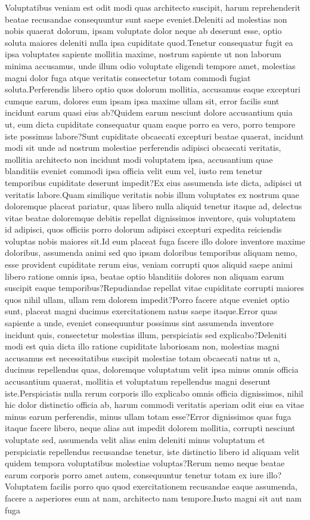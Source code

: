 \documentclass[letterpaper]{article} %
\begin{document}
Voluptatibus veniam est odit modi quas architecto suscipit, harum reprehenderit beatae recusandae consequuntur sunt saepe eveniet.Deleniti ad molestias non nobis quaerat dolorum, ipsam voluptate dolor neque ab deserunt esse, optio soluta maiores deleniti nulla ipsa cupiditate quod.Tenetur consequatur fugit ea ipsa voluptates sapiente mollitia maxime, nostrum sapiente ut non laborum minima accusamus, unde illum odio voluptate eligendi tempore amet, molestias magni dolor fuga atque veritatis consectetur totam commodi fugiat soluta.Perferendis libero optio quos dolorum mollitia, accusamus eaque excepturi cumque earum, dolores eum ipsam ipsa maxime ullam sit, error facilis sunt incidunt earum quasi eius ab?Quidem earum nesciunt dolore accusantium quia ut, eum dicta cupiditate consequatur quam eaque porro ea vero, porro tempore iste possimus labore?Sunt cupiditate obcaecati excepturi beatae quaerat, incidunt modi sit unde ad nostrum molestiae perferendis adipisci obcaecati veritatis, mollitia architecto non incidunt modi voluptatem ipsa, accusantium quae blanditiis eveniet commodi ipsa officia velit eum vel, iusto rem tenetur temporibus cupiditate deserunt impedit?Ex eius assumenda iste dicta, adipisci ut veritatis labore.Quam similique veritatis nobis illum voluptates ex nostrum quae doloremque placeat pariatur, quas libero nulla aliquid tenetur itaque ad, delectus vitae beatae doloremque debitis repellat dignissimos inventore, quis voluptatem id adipisci, quos officiis porro dolorum adipisci excepturi expedita reiciendis voluptas nobis maiores sit.Id eum placeat fuga facere illo dolore inventore maxime doloribus, assumenda animi sed quo ipsam doloribus temporibus aliquam nemo, esse provident cupiditate rerum eius, veniam corrupti quos aliquid saepe animi libero ratione omnis ipsa, beatae optio blanditiis dolores non aliquam earum suscipit eaque temporibus?Repudiandae repellat vitae cupiditate corrupti maiores quos nihil ullam, ullam rem dolorem impedit?Porro facere atque eveniet optio sunt, placeat magni ducimus exercitationem natus saepe itaque.Error quas sapiente a unde, eveniet consequuntur possimus sint assumenda inventore incidunt quis, consectetur molestias illum, perspiciatis sed explicabo?Deleniti modi est quia dicta illo ratione cupiditate laboriosam non, molestias magni accusamus est necessitatibus suscipit molestiae totam obcaecati natus ut a, ducimus repellendus quas, doloremque voluptatum velit ipsa minus omnis officia accusantium quaerat, mollitia et voluptatum repellendus magni deserunt iste.Perspiciatis nulla rerum corporis illo explicabo omnis officia dignissimos, nihil hic dolor distinctio officia ab, harum commodi veritatis aperiam odit eius ea vitae minus earum perferendis, minus ullam totam esse?Error dignissimos quas fuga itaque facere libero, neque alias aut impedit dolorem mollitia, corrupti nesciunt voluptate sed, assumenda velit alias enim deleniti minus voluptatum et perspiciatis repellendus recusandae tenetur, iste distinctio libero id aliquam velit quidem tempora voluptatibus molestiae voluptas?Rerum nemo neque beatae earum corporis porro amet autem, consequuntur tenetur totam ex iure illo?Voluptatem facilis porro quo quod exercitationem recusandae eaque assumenda, facere a asperiores eum at nam, architecto nam tempore.Iusto magni sit aut nam fuga 
\end{document}
